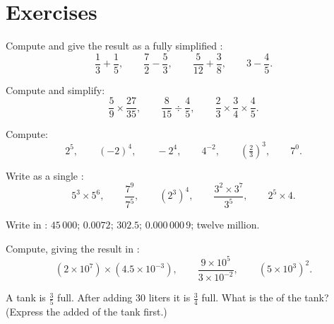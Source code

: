 \section{Exercises}

\begin{exercise}[$\star$]\label{exo:g9:fractions:1}
Compute and give the result as a fully simplified :
\[
\frac13 + \frac15, \qquad
\frac72 - \frac53, \qquad
\frac{5}{12} + \frac38, \qquad
3 - \frac45 .
\]
\end{exercise}

\begin{exercise}[$\star$]\label{exo:g9:fractions:2}
Compute and simplify:
\[
\frac59 \times \frac{27}{35}, \qquad
\frac{8}{15} \div \frac{4}{5}, \qquad
\frac23 \times \frac34 \times \frac45 .
\]
\end{exercise}

\begin{exercise}[$\star$]\label{exo:g9:fractions:3}
Compute:
\[
2^5, \qquad (-2)^4, \qquad -2^4, \qquad 4^{-2}, \qquad
\left(\tfrac23\right)^3, \qquad 7^0 .
\]
\end{exercise}

\begin{exercise}[$\star$]\label{exo:g9:fractions:4}
Write as a single :
\[
5^3 \times 5^6, \qquad
\frac{7^9}{7^5}, \qquad
\left(2^3\right)^4, \qquad
\frac{3^2 \times 3^7}{3^5}, \qquad
2^5 \times 4 .
\]
\end{exercise}

\begin{exercise}[$\star$]\label{exo:g9:fractions:5}
Write in : $45\,000$; $0.0072$; $302.5$;
$0.000\,000\,9$; twelve million.
\end{exercise}

\begin{exercise}[$\star\star$]\label{exo:g9:fractions:6}
Compute, giving the result in :
\[
(2 \times 10^7) \times (4.5 \times 10^{-3}),
\qquad
\frac{9 \times 10^5}{3 \times 10^{-2}},
\qquad
(5 \times 10^3)^2 .
\]
\end{exercise}

\begin{exercise}[$\star\star$]\label{exo:g9:fractions:7}
A tank is $\frac35$ full. After adding $30$ liters it is $\frac34$ full.
What is the  of the tank? (Express the added  of the tank
first.)
\end{exercise}


